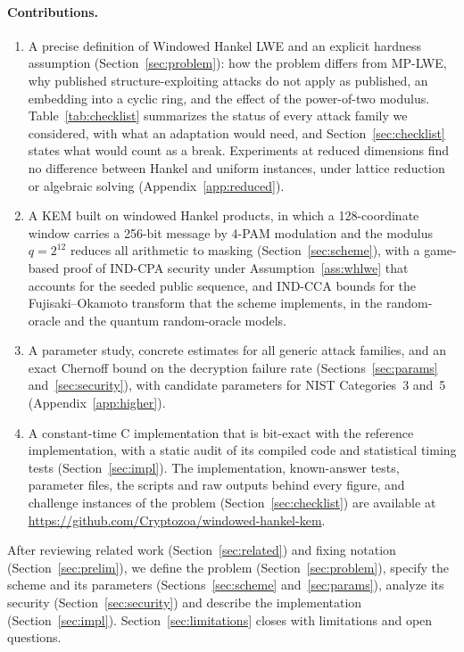 \documentclass[11pt,a4paper]{article}
\theoremstyle{definition}
\begin{document}
\paragraph{Contributions.}
\begin{enumerate}
  \item A precise definition of Windowed Hankel LWE and an explicit hardness assumption (Section~\ref{sec:problem}): how the problem differs from MP-LWE, why published structure-exploiting attacks do not apply as published, an embedding into a cyclic ring, and the effect of the power-of-two modulus. Table~\ref{tab:checklist} summarizes the status of every attack family we considered, with what an adaptation would need, and Section~\ref{sec:checklist} states what would count as a break. Experiments at reduced dimensions find no difference between Hankel and uniform instances, under lattice reduction or algebraic solving (Appendix~\ref{app:reduced}).
  \item A KEM built on windowed Hankel products, in which a 128-coordinate window carries a 256-bit message by 4-PAM modulation and the modulus $q = 2^{12}$ reduces all arithmetic to masking (Section~\ref{sec:scheme}), with a game-based proof of IND-CPA security under Assumption~\ref{ass:whlwe} that accounts for the seeded public sequence, and IND-CCA bounds for the Fujisaki--Okamoto transform that the scheme implements, in the random-oracle and the quantum random-oracle models.
  \item A parameter study, concrete estimates for all generic attack families, and an exact Chernoff bound on the decryption failure rate (Sections~\ref{sec:params} and~\ref{sec:security}), with candidate parameters for NIST Categories~3 and~5 (Appendix~\ref{app:higher}).
  \item A constant-time C implementation that is bit-exact with the reference implementation, with a static audit of its compiled code and statistical timing tests (Section~\ref{sec:impl}). The implementation, known-answer tests, parameter files, the scripts and raw outputs behind every figure, and challenge instances of the problem (Section~\ref{sec:checklist}) are available at \url{https://github.com/Cryptozoa/windowed-hankel-kem}.
\end{enumerate}

After reviewing related work (Section~\ref{sec:related}) and fixing notation (Section~\ref{sec:prelim}), we define the problem (Section~\ref{sec:problem}), specify the scheme and its parameters (Sections~\ref{sec:scheme} and~\ref{sec:params}), analyze its security (Section~\ref{sec:security}) and describe the implementation (Section~\ref{sec:impl}). Section~\ref{sec:limitations} closes with limitations and open questions.
\end{document}

